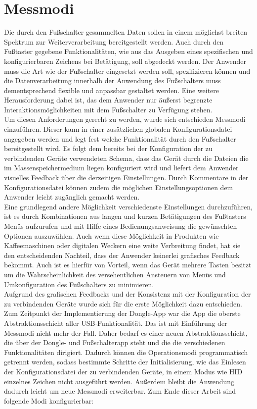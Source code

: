 \section{Messmodi}
Die durch den Fußschalter gesammelten Daten sollen in einem möglichst breiten Spektrum zur Weiterverarbeitung bereitgestellt werden. Auch durch den Fußtaster gegebene Funktionalitäten, wie aus das Ausgeben eines spezifischen und konfigurierbaren Zeichens bei Betätigung, soll abgedeckt werden. Der Anwender muss die Art wie der Fußschalter eingesetzt werden soll, spezifizieren können und die Datenverarbeitung innerhalb der Anwendung des Fußschalters muss dementsprechend flexible und anpassbar gestaltet werden. Eine weitere Herausforderung dabei ist, das dem Anwender nur äußerst begrenzte Interaktionsmöglichkeiten mit dem Fußschalter zu Verfügung stehen.\\
Um diesen Anforderungen gerecht zu werden, wurde sich entschieden Messmodi einzuführen. Dieser kann in einer zusätzlichen globalen Konfigurationsdatei angegeben werden und legt fest welche Funktionalität durch den Fußschalter bereitgestellt wird. Es folgt dem bereits bei der Konfiguration der zu verbindenden Geräte verwendeten Schema, dass das Gerät durch die Dateien die im Massenspeichermedium liegen konfiguriert wird und liefert dem Anwender visuelles Feedback über die derzeitigen Einstellungen. Durch Kommentare in der Konfigurationsdatei können zudem die möglichen Einstellungsoptionen dem Anwender leicht zugänglich gemacht werden.\\
Eine grundlegend andere Möglichkeit verschiedenste Einstellungen durchzuführen, ist es durch Kombinationen aus langen und kurzen Betätigungen des Fußtasters Menüs aufzurufen und mit Hilfe eines Bedienungsanweisung die gewünschten Optionen auszuwählen. Auch wenn diese Möglichkeit in Produkten wie Kaffeemaschinen oder digitalen Weckern eine weite Verbreitung findet, hat sie den entscheidenden Nachteil, dass der Anwender keinerlei grafisches Feedback bekommt. Auch ist es hierfür von Vorteil, wenn das Gerät mehrere Tasten besitzt um die Wahrscheinlichkeit des versehentlichen Ansteuern von Menüs und Umkonfiguration des Fußschalters zu minimieren.\\
Aufgrund des grafischen Feedbacks und der Konsistenz mit der Konfiguration der zu verbindenden Geräte wurde sich für die erste Möglichkeit dazu entschieden. Zum Zeitpunkt der Implementierung der Dongle-App war die App die oberste Abstraktionsschicht aller USB-Funktionalität. Das ist mit Einführung der Messmodi nicht mehr der Fall. Daher bedarf es einer neuen Abstraktionsschicht, die über der Dongle- und Fußschalterapp steht und die die verschiedenen Funktionalitäten dirigiert. Dadurch können die Operationsmodi programmatisch getrennt werden, sodass bestimmte Schritte der Initialisierung, wie das Einlesen der Konfigurationsdatei der zu verbindenden Geräte, in einem Modus wie \ac{HID} einzelnes Zeichen nicht ausgeführt werden. Außerdem bleibt die Anwendung dadurch leicht um neue Messmodi erweiterbar. Zum Ende dieser Arbeit sind folgende Modi konfigurierbar:
